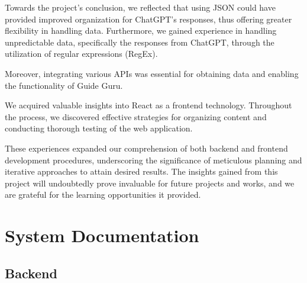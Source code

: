 \documentclass[english,notitlepage,smartquotes]{hgbreport}
\begin{document}
Towards the project's conclusion, we reflected that using JSON could have provided improved organization for ChatGPT's responses, thus offering greater flexibility in handling data. Furthermore, we gained experience in handling unpredictable data, specifically the responses from ChatGPT, through the utilization of regular expressions (RegEx).

Moreover, integrating various APIs was essential for obtaining data and enabling the functionality of Guide Guru.

We acquired valuable insights into React as a frontend technology. Throughout the process, we discovered effective strategies for organizing content and conducting thorough testing of the web application.

These experiences expanded our comprehension of both backend and frontend development procedures, underscoring the significance of meticulous planning and iterative approaches to attain desired results. The insights gained from this project will undoubtedly prove invaluable for future projects and works, and we are grateful for the learning opportunities it provided.


\chapter{System Documentation}


\section{Backend}
\end{document}
